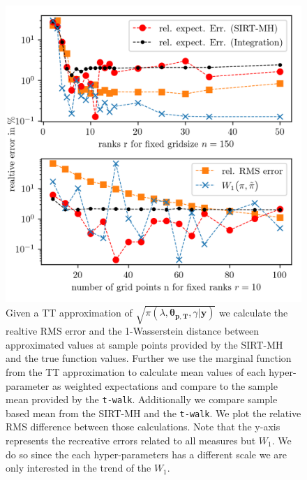 \begin{figure}[ht!]%
	\includegraphics[]{findGridRank.png}
	\caption[Optimal rank and number of grid points for TT approximation.]{Given a TT approximation of $\sqrt{\pi( \lambda,\bm{\theta}_{\bm{p}, \bm{T}},\gamma  | \bm{y}) }$ we calculate the realtive RMS error and the 1-Wasserstein distance between approximated values at sample points provided by the SIRT-MH and the true function values. Further we use the marginal function from the TT approximation to calculate mean values of each hyper-parameter as weighted expectations and compare to the sample mean provided by the \texttt{t-walk}. Additionally we compare sample based mean from the SIRT-MH and the \texttt{t-walk}. We plot the relative RMS difference between those calculations. Note that the y-axis represents the recreative errors related to all measures but $W_1$. We do so since the each hyper-parameters has a different scale we are only interested in the trend of the $W_1$.}
	\label{fig:FindRankGrid}
\end{figure}
\clearpage

